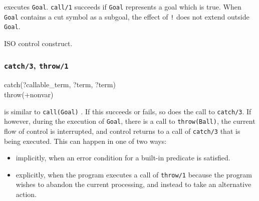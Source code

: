 \Description

 executes \texttt{Goal}. \texttt{call/1} succeeds if
\texttt{Goal} represents a goal which is true. When \texttt{Goal} contains a
cut symbol \IdxCC["!/0]{!}  as a subgoal, the effect of
\texttt{!} does not extend outside \texttt{Goal}. 

\begin{PlErrors}




\end{PlErrors}

\Portability

ISO control construct.

\subsubsection{\texttt{catch/3},
\texttt{throw/1}}
\label{catch/3}

\begin{TemplatesOneCol}
catch(?callable\_term, ?term, ?term)\\
throw(+nonvar)

\end{TemplatesOneCol}

\Description

 is similar to \texttt{call(Goal)}
. If this succeeds or fails, so does the call to
\texttt{catch/3}. If however, during the execution of \texttt{Goal}, there
is a call to \texttt{throw(Ball)}, the current flow of control is
interrupted, and control returns to a call of \texttt{catch/3} that is being
executed. This can happen in one of two ways: 

\begin{itemize}

\item implicitly, when an error condition for a built-in predicate is
satisfied.

\item explicitly, when the program executes a call of \texttt{throw/1}
because the program wishes to abandon the current processing, and instead to
take an alternative action.

\end{itemize}

